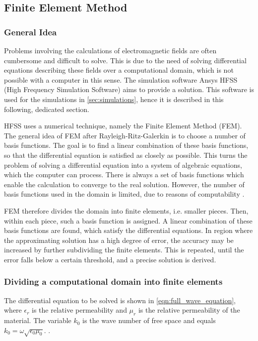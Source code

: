 \subsection{Finite Element Method}

\subsubsection{General Idea}
Problems involving the calculations of electromagnetic fields are often cumbersome and difficult to solve. This is due to the need of solving differential equations describing these fields over a computational domain, which is not possible with a computer in this sense. The simulation software Ansys HFSS (High Frequency Simulation Software) aims to provide a solution. This software is used for the simulations in \autoref{sec:simulations}, hence it is described in this following, dedicated section.

HFSS uses a numerical technique, namely the Finite Element Method (FEM). The general idea of FEM after Rayleigh-Ritz-Galerkin is to choose a number of basis functions. The goal is to find a linear combination of these basis functions, so that the differential equation is satisfied as closely as possible. This turns the problem of solving a differential equation into a system of algebraic equations, which the computer can process. There is always a set of basis functions which enable the calculation to converge to the real solution. However, the number of basis functions used in the domain is limited, due to reasons of computability \cite{STRANG_2018}. 

FEM therefore divides the domain into finite elements, i.e. smaller pieces. Then, within each piece, such a basis function is assigned. A linear combination of these basis functions are found, which satisfy the differential equations. In region where the approximating solution has a high degree of error, the accuracy may be increased by further subdividing the finite elements. This is repeated, until the error falls below a certain threshold, and a precise solution is derived.

\subsubsection{Dividing a computational domain into finite elements}

The differential equation to be solved is shown in \autoref{eqn:full_wave_equation}, where $\epsilon_r$ is the relative permeability and $\mu_r$ is the relative permeability of the material. The variable $k_0$ is the wave number of free space and equals $k_0=\omega\sqrt{\epsilon_0\mu_0}$. \cite{Cendes_Lee_1988,85399,Cendes_1991}.


